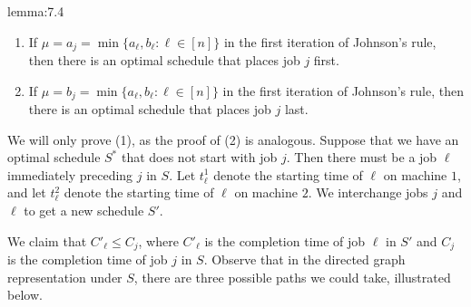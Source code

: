 \begin{lemma}{lemma:7.4}
    \begin{enumerate}[(1)]
        \item If $\mu = a_j = \min\{a_\ell, b_\ell : \ell \in [n]\}$ in the 
        first iteration of Johnson's rule, then there is an optimal schedule 
        that places job $j$ first. 
        \item If $\mu = b_j = \min\{a_\ell, b_\ell : \ell \in [n]\}$ in the 
        first iteration of Johnson's rule, then there is an optimal schedule 
        that places job $j$ last. 
    \end{enumerate}
\end{lemma}
\begin{pf}
    We will only prove (1), as the proof of (2) is analogous. 
    Suppose that we have an optimal schedule $S^*$ that does not start with 
    job $j$. Then there must be a job $\ell$ immediately preceding $j$ in 
    $S$. Let $t_\ell^1$ denote the starting time of $\ell$ on machine $1$, 
    and let $t_\ell^2$ denote the starting time of $\ell$ on machine $2$. 
    We interchange jobs $j$ and $\ell$ to get a new schedule $S'$. 

    We claim that $C'_\ell \leq C_j$, where $C'_\ell$ is the completion time 
    of job $\ell$ in $S'$ and $C_j$ is the completion time of job $j$ in $S$. 
    Observe that in the directed graph representation under $S$, 
    there are three possible paths we could take, illustrated below. 
    \begin{center}
\end{center}
\end{pf}
